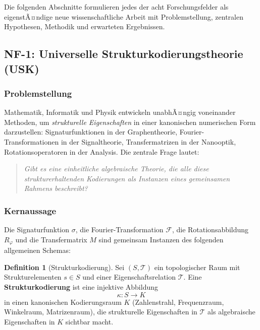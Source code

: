 ﻿\documentclass[a4paper,12pt]{scrreprt}
\theoremstyle{definition}
\newtheorem{definition}{Definition}[section]
\begin{document}
Die folgenden Abschnitte formulieren jedes der acht Forschungsfelder
als eigenstÃ¤ndige neue wissenschaftliche Arbeit mit Problemstellung,
zentralen Hypothesen, Methodik und erwarteten Ergebnissen.

\subsection{NF-1: Universelle Strukturkodierungstheorie (USK)}

\subsubsection{Problemstellung}

Mathematik, Informatik und Physik entwickeln unabhÃ¤ngig voneinander Methoden,
um \emph{strukturelle Eigenschaften} in einer kanonischen numerischen Form
darzustellen: Signaturfunktionen in der Graphentheorie, Fourier-Transformationen
in der Signaltheorie, Transfermatrizen in der Nanooptik, Rotationsoperatoren
in der Analysis. Die zentrale Frage lautet:

\begin{quote}
  \itshape
  Gibt es eine einheitliche algebraische Theorie, die alle diese
  strukturerhaltenden Kodierungen als Instanzen eines gemeinsamen Rahmens
  beschreibt?
\end{quote}

\subsubsection{Kernaussage}

Die Signaturfunktion $\sigma$, die Fourier-Transformation $\mathcal{F}$,
die Rotationsabbildung $R_\varphi$ und die Transfermatrix $M$ sind
gemeinsam Instanzen des folgenden allgemeinen Schemas:

\begin{definition}[Strukturkodierung]
  Sei $(S, \mathcal{T})$ ein topologischer Raum mit Strukturelementen
  $s \in S$ und einer Eigenschaftsrelation $\mathcal{T}$. Eine
  \textbf{Strukturkodierung} ist eine injektive Abbildung
  \[
    \kappa: S \longrightarrow K
  \]
  in einen kanonischen Kodierungsraum $K$ (Zahlenstrahl, Frequenzraum,
  Winkelraum, Matrizenraum), die strukturelle Eigenschaften in
  $\mathcal{T}$ als algebraische Eigenschaften in $K$ sichtbar macht.
\end{definition}
\end{document}
